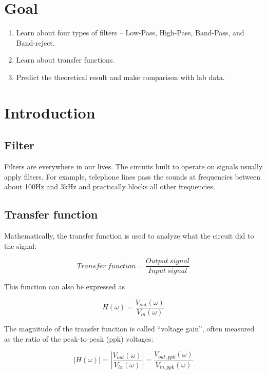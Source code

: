 \documentclass{article}
\begin{document}
\newpage
\section{Goal}

\begin{enumerate}

\item

Learn about four types of filters – Low-Pass, High-Pass, Band-Pass, and Band-reject.

\item

Learn about transfer functions.

\item

Predict the theoretical result and make comparison with lab data.

\end{enumerate}
\section{Introduction}

\subsection{Filter}

Filters are everywhere in our lives. The circuits built to operate on signals usually apply filters. For example, telephone lines pass the sounds at frequencies between about 100Hz and 3kHz and practically blocks all other frequencies.

\subsection{Transfer function}

Mathematically, the transfer function is used to analyze what the circuit did to the signal:

$$Transfer\ function=\frac{Output\ signal}{Input\ signal}$$

This function can also be expressed as

$$H(\omega)=\frac{V_{out}(\omega)}{V_{in}(\omega)}$$

The magnitude of the transfer function is called “voltage gain”, often measured as the ratio of the peak-to-peak (ppk) voltages:

$$|H(\omega)|=\left|\frac{V_{out}(\omega)}{V_{in}(\omega)}\right|=\frac{V_{out,ppk}(\omega)}{V_{in,ppk}(\omega)}$$
\end{document}
